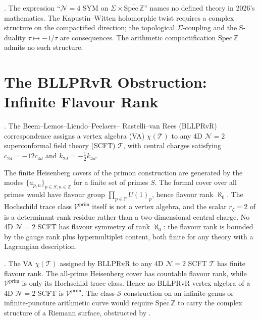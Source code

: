 \begin{corollary}
\label{v4-arith:cor:no-arith-4D-SYM}
\ClaimStatusProvedHere. The expression ``\(\mathcal{N}=4\) SYM on
\(\Sigma\times\overline{\mathrm{Spec}\,\mathbb{Z}}\)'' names no
defined theory in 2026's mathematics. The Kapustin--Witten holomorphic
twist requires a complex structure on the compactified direction; the
topological \(\Sigma\)-coupling and the S-duality
\(\tau\mapsto-1/\tau\) are consequences. The arithmetic compactification
\(\overline{\mathrm{Spec}\,\mathbb{Z}}\) admits no such structure.
\end{corollary}

\section{The BLLPRvR Obstruction: Infinite Flavour Rank}
\label{v4-arith:wit:BLLPRvR-fails}

\begin{theorem}
\label{v4-arith:thm:BLLPRvR}
\ClaimStatusProvedElsewhere. The Beem--Lemos--Liendo--Peelaers--%
Rastelli--van Rees (BLLPRvR) correspondence assigns a vertex algebra (VA)
\(\chi(\mathcal{T})\) to any 4D \(\mathcal{N}=2\) superconformal field
theory (SCFT) \(\mathcal{T}\), with central charges satisfying
\(c_{2d}=-12c_{4d}\) and \(k_{2d}=-\tfrac{1}{2}k_{4d}\).
\end{theorem}

\begin{observation}
\label{v4-arith:obs:BLLPRvR-rank-mismatch}
The finite Heisenberg covers of the primon construction are generated
by the modes \(\{a_{p,n}\}_{p\in S,n\in\mathbb{Z}}\) for a finite set
of primes \(S\). The formal cover over all primes would have flavour
group \(\prod_{p\in\mathbb{P}}U(1)_{p}\), hence flavour rank
\(\aleph_{0}\). The Hochschild trace class
\(\mathcal{V}^{\mathrm{prim}}\) itself is not a vertex algebra, and
the scalar \(r_{\zeta}=2\) of  is a
determinant-rank residue rather than a two-dimensional central charge.
No 4D \(\mathcal{N}=2\) SCFT has flavour symmetry of rank \(\aleph_{0}\):
the flavour rank is bounded by the gauge rank plus hypermultiplet content,
both finite for any theory with a Lagrangian description.
\end{observation}

\begin{corollary}
\label{v4-arith:cor:BLLPRvR-fails-arith}
\ClaimStatusProvedHere. The VA \(\chi(\mathcal{T})\) assigned by
BLLPRvR to any 4D \(\mathcal{N}=2\) SCFT \(\mathcal{T}\) has finite
flavour rank. The all-prime Heisenberg cover has countable flavour
rank, while \(\mathcal{V}^{\mathrm{prim}}\) is only its Hochschild trace
class. Hence no BLLPRvR vertex algebra of a 4D \(\mathcal{N}=2\) SCFT
is \(\mathcal{V}^{\mathrm{prim}}\).
The class-\(\mathcal{S}\) construction on an infinite-genus or
infinite-puncture arithmetic curve would require
\(\overline{\mathrm{Spec}\,\mathbb{Z}}\) to carry the complex structure
of a Riemann surface, obstructed by
.
\end{corollary}

